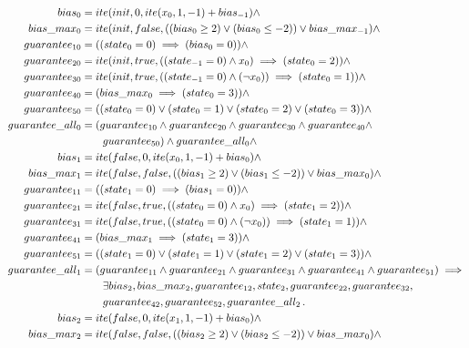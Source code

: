 \begin{equation}
\begin{aligned}
   bias_0&=ite(init, 0, ite(x_0, 1, -1)+bias_{-1}) \land \\
    bias\_max_0&=ite(init, false, ((bias_0\ge 2)\lor (bias_0\le -2))\lor bias\_max_{-1})\land \\
    guarantee_{10}&=((state_0=0)\implies(bias_0=0))\land \\
    guarantee_{20}&=ite(init, true, ((state_{-1}=0)\land x_0)\implies(state_0=2))\land \\
    guarantee_{30}&=ite(init, true, ((state_{-1}=0)\land (\neg x_0))\implies(state_0=1))\land \\
    guarantee_{40}&=(bias\_max_0\implies(state_0=3))\land \\
    guarantee_{50}&=((state_0=0) \lor (state_0=1) \lor (state_0=2) \lor (state_0=3))\land \\
    guarantee\_all_0&=(guarantee_{10}\land guarantee_{20}\land
    guarantee_{30}\land guarantee_{40} \land \\ &\qquad {} guarantee_{50}) 
    \land guarantee\_all_0 \land \\
    bias_1&=ite(false, 0, ite(x_0, 1, -1)+bias_0)\land \\
    bias\_max_1&=ite(false, false, ((bias_1\ge 2)\lor (bias_1\le-2))\lor bias\_max_0)\land \\
    guarantee_{11}&=((state_1=0)\implies(bias_1=0))\land \\
    guarantee_{21}&=ite(false, true, ((state_0=0)\land x_0)\implies(state_1=2))\land \\
    guarantee_{31}&=ite(false, true, ((state_0=0)\land (\neg x_0))\implies(state_1=1))\land \\
    guarantee_{41}&=(bias\_max_1\implies(state_1=3))\land \\
    guarantee_{51}&=((state_1=0) \lor (state_1=1) \lor (state_1=2) \lor (state_1=3))\land \\
    guarantee\_all_1&=(guarantee_{11}\land guarantee_{21}\land guarantee_{31}\land guarantee_{41} \land guarantee_{51})
\implies \\ &\qquad {}
\exists bias_2, bias\_max_2, guarantee_{12}, state_2, guarantee_{22},
guarantee_{32}, \\ &\qquad {} guarantee_{42}, guarantee_{52}, guarantee\_all_2
\such  \\
  bias_2&=ite(false, 0, ite(x_1, 1, -1)+bias_0) \land\\
  bias\_max_2&=ite(false, false, ((bias_2\ge 2) \lor (bias_2\le -2)) \lor bias\_max_0) \land\\

\end{aligned}
\end{equation}
